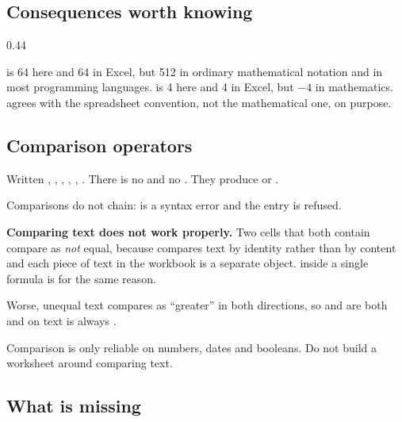 \subsection{Consequences worth knowing}

\begin{ccexamples}[]{0.44\linewidth}
\end{ccexamples}

\begin{ccnote}
 is 64 here and 64 in Excel, but 512 in ordinary mathematical
notation and in most programming languages.  is 4 here and 4 in
Excel, but $-4$ in mathematics. \ccprod{} agrees with the spreadsheet
convention, not the mathematical one, on purpose.
\end{ccnote}

\subsection{Comparison operators}

Written \lit{=}, \lit{<>}, \lit{<}, \lit{>}, \lit{<=}, \lit{>=}. There is no
\lit{!=} and no \lit{==}. They produce  or .

Comparisons do not chain:  is a syntax error and the entry is
refused.

\begin{cccaution}
\textbf{Comparing text does not work properly.} Two cells that both contain
 compare as \emph{not} equal, because \ccprod{} compares text by
identity rather than by content and each piece of text in the workbook is a
separate object.  inside a single formula is  for the
same reason.

Worse, unequal text compares as ``greater'' in both directions, so
 and  are both  and \lit{<} on text is
always .

Comparison is only reliable on numbers, dates and booleans. Do not build a
worksheet around comparing text.
\end{cccaution}

\subsection{What is missing}

